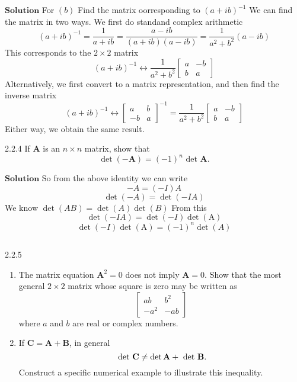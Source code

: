 $$$$

$\boxed{\textbf{Solution}}$  For $(b)$ Find the matrix oorresponding to $(a+i b)^{-1}$ We can find the matrix in two ways. We first do standand complex arithmetic
$$
(a+i b)^{-1}=\frac{1}{a+i b}=\frac{a-i b}{(a+i b)(a-i b)}=\frac{1}{a^{2}+b^{2}}(a-i b)
$$
This corresponds to the $2 \times 2$ matrix
$$
(a+i b)^{-1} \longleftrightarrow \frac{1}{a^{2}+b^{2}}\begin{bmatrix}{a} & {-b} \\ {b} & {a}\end{bmatrix}
$$
Alternatively, we first convert to a matrix representation, and then find the inverse
matrix
$$
(a+i b)^{-1} \leftrightarrow\begin{bmatrix}{a} & {b} \\ {-b} & {a}\end{bmatrix}^{-1}=\frac{1}{a^{2}+b^{2}}\begin{bmatrix}{a} & {-b} \\ {b} & {a}\end{bmatrix}
$$
Either way, we obtain the same result.

\newpage

\begin{mybox}{2.2.4}
If $\mathbf{A}$ is an $n \times n$ matrix, show that
$$
\operatorname{det}(-\mathbf{A})=(-1)^{n} \text { det } \mathbf{A}.
$$
\end{mybox}




$\boxed{\textbf{Solution}}$ 
So from the above identity we can write
$$-A=(-I) A$$
$$\operatorname{det}(-A)=\operatorname{det}(-I A)$$
We know $\operatorname{det}(A B)=\operatorname{det}(A) \operatorname{det}(B)$
From this
$$\operatorname{det}(-I A)=\operatorname{det}(-I) \operatorname{det}(\mathrm{A})$$
$$\operatorname{det}(-I) \operatorname{det}(\mathrm{A})=(-1)^{n} \operatorname{det}(A)$$

$$$$

\begin{mybox}{2.2.5}
\begin{enumerate}[$(a)$]
\item The matrix equation $\mathbf{A}^{2}=0$ does not imply $\mathbf{A}=0 .$ Show that the most general
$2 \times 2$ matrix whose square is zero may be written as
$$
\begin{bmatrix}{a b} & {b^{2}} \\ {-a^{2}} & {-a b}\end{bmatrix}
$$
where $a$ and $b$ are real or complex numbers.
\item If $\mathbf{C}=\mathbf{A}+\mathbf{B}$, in general
$$
\text { det } \mathbf{C}\neq \operatorname{det} \mathbf{A}+\text { det } \mathbf{B} \text.
$$
Construct a specific numerical example to illustrate this inequality.
\end{enumerate}
\end{mybox}


